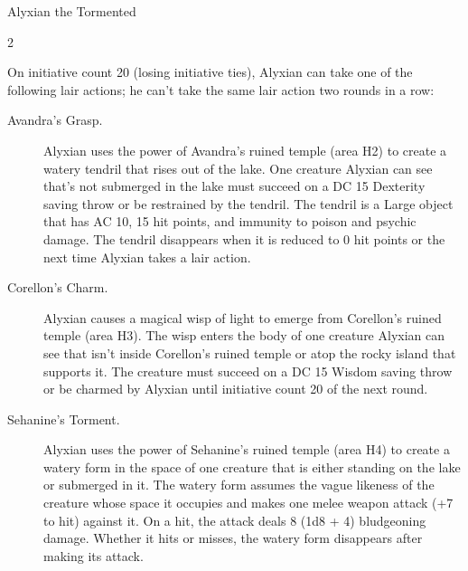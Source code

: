 \documentclass[10pt,a4paper,twoside,bg=print,twocolumn,openany,nodeprecatedcode]{dndbook}
\begin{document}
\begin{DndMonster}[float*=b,width=\textwidth + 8pt]{Alyxian the Tormented}
\begin{multicols}{2}
\begin{DndMonsterLegendaryActions}
\end{DndMonsterLegendaryActions}
On initiative count 20 (losing initiative ties), Alyxian can take one of the following lair actions; he can't take the same lair action two rounds in a row:


\begin{description}
\item[Avandra's Grasp.]
Alyxian uses the power of Avandra's ruined temple (area H2) to create a watery tendril that rises out of the lake. One creature Alyxian can see that's not submerged in the lake must succeed on a DC 15 Dexterity saving throw or be restrained by the tendril. The tendril is a Large object that has AC 10, 15 hit points, and immunity to poison and psychic damage. The tendril disappears when it is reduced to 0 hit points or the next time Alyxian takes a lair action.

\item[Corellon's Charm.]
Alyxian causes a magical wisp of light to emerge from Corellon's ruined temple (area H3). The wisp enters the body of one creature Alyxian can see that isn't inside Corellon's ruined temple or atop the rocky island that supports it. The creature must succeed on a DC 15 Wisdom saving throw or be charmed by Alyxian until initiative count 20 of the next round.

\item[Sehanine's Torment.]
Alyxian uses the power of Sehanine's ruined temple (area H4) to create a watery form in the space of one creature that is either standing on the lake or submerged in it. The watery form assumes the vague likeness of the creature whose space it occupies and makes one melee weapon attack (+7 to hit) against it. On a hit, the attack deals 8 (1d8 + 4) bludgeoning damage. Whether it hits or misses, the watery form disappears after making its attack.


\end{description}
\end{multicols}
\end{DndMonster}
\end{document}
